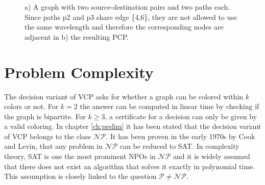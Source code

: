 \begin{center}
\begin{figure}

\caption{a) A graph with two source-destination pairs and two paths each. Since paths p2 and p3 share edge \{4,6\}, they are not allowed to use the same wavelength and therefore the corresponding nodes are adjacent in b) the resulting PCP.}
\label{pd:transformation}
\end{figure}
\end{center}


\section{Problem Complexity}

The decision variant of VCP asks for whether a graph can be colored within $k$ colors or not. For $k=2$ the answer can be computed in linear time by checking if the graph is bipartite. For $k\geq 3$, a certificate for a decision can only be given by a valid coloring. In chapter \ref{ch:prelim} it has been stated that the decision variant of VCP belongs to the class $\mathcal{NP}$. It has been proven in the early 1970s by Cook and Levin, that any problem in $\mathcal{NP}$ can be reduced to SAT. In complexity theory, SAT is one the most prominent NPOs in $\mathcal{NP}$ and it is widely assumed that there does not exist an algorithm that solves it exactly in polynomial time. This assumption is closely linked to the question $\mathcal{P} \neq \mathcal{NP}$.

